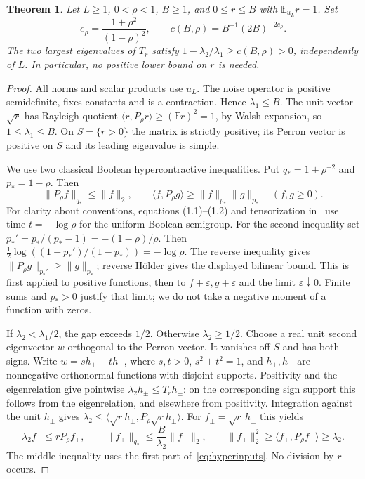 \documentclass[11pt]{article}
\newtheorem{theorem}{Theorem}
\begin{document}
\begin{theorem}\label{thm:density}
Let $L\ge1$, $0<\rho<1$, $B\ge1$, and $0\le r\le B$ with
$\mathbb E_{u_L}r=1$. Set
\[
 e_\rho=\frac{1+\rho^2}{(1-\rho)^2},\qquad
 c(B,\rho)=B^{-1}(2B)^{-2e_\rho}.
\]
The two largest eigenvalues of $T_r$ satisfy
$1-\lambda_2/\lambda_1\ge c(B,\rho)>0$, independently of $L$.
In particular, no positive lower bound on $r$ is needed.
\end{theorem}
\begin{proof}
All norms and scalar products use $u_L$. The noise operator is positive
semidefinite, fixes constants and is a contraction. Hence
$\lambda_1\le B$. The unit vector $\sqrt r$ has Rayleigh quotient
$\langle r,P_\rho r\rangle\ge(\mathbb E r)^2=1$, by Walsh expansion,
so $1\le\lambda_1\le B$. On $S=\{r>0\}$ the matrix is strictly positive;
its Perron vector is positive on $S$ and its leading eigenvalue is simple.

We use two classical Boolean hypercontractive inequalities. Put
$q_*=1+\rho^{-2}$ and $p_*=1-\rho$. Then
\begin{equation}\label{eq:hyperinputs}
 \|P_\rho f\|_{q_*}\le\|f\|_2,\qquad
 \langle f,P_\rho g\rangle\ge\|f\|_{p_*}\|g\|_{p_*}\quad(f,g\ge0).
\end{equation}
For clarity about conventions, equations (1.1)--(1.2) and tensorization
in~\cite{MOS} use time $t=-\log\rho$ for the uniform Boolean semigroup.
For the second inequality set $p_*'=p_*/(p_*-1)=-(1-\rho)/\rho$.
Then
$\tfrac12\log((1-p_*')/(1-p_*))=-\log\rho$.
The reverse inequality gives $\|P_\rho g\|_{p_*'}\ge\|g\|_{p_*}$;
reverse H\"older gives the displayed bilinear bound. This is first applied
to positive functions, then to $f+\varepsilon,g+\varepsilon$ and the limit
$\varepsilon\downarrow0$. Finite sums and $p_*>0$ justify that limit;
we do not take a negative moment of a function with zeros.

If $\lambda_2<\lambda_1/2$, the gap exceeds $1/2$. Otherwise
$\lambda_2\ge1/2$. Choose a real unit second eigenvector $w$ orthogonal
to the Perron vector. It vanishes off $S$ and has both signs. Write
$w=s h_+-t h_-$, where $s,t>0$, $s^2+t^2=1$, and $h_+,h_-$ are
nonnegative orthonormal functions with disjoint supports. Positivity
and the eigenrelation give pointwise
$\lambda_2h_\pm\le T_rh_\pm$: on the corresponding sign support this
follows from the eigenrelation, and elsewhere from positivity.
Integration against the unit $h_\pm$ gives
$\lambda_2\le\langle\sqrt r h_\pm,P_\rho\sqrt r h_\pm\rangle$.
For $f_\pm=\sqrt r\,h_\pm$ this yields
\[
 \lambda_2f_\pm\le rP_\rho f_\pm,\qquad
 \|f_\pm\|_{q_*}\le\frac B{\lambda_2}\|f_\pm\|_2,\qquad
 \|f_\pm\|_2^2\ge\langle f_\pm,P_\rho f_\pm\rangle\ge\lambda_2.
\]
The middle inequality uses the first part of~\eqref{eq:hyperinputs}.
No division by $r$ occurs.


\end{proof}
\end{document}

